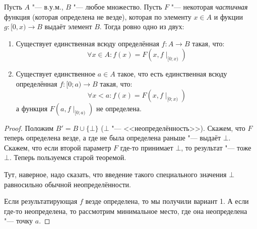 \begin{theorem}
	Пусть $A$ "--- в.у.м., $B$ "--- любое множество.
	Пусть $F$ "--- некоторая \textit{частичная} функция (которая определена не везде),
	которая по элементу $x \in A$ и фукции $g \colon [0, x) \to B$ выдаёт элемент $B$.
	Тогда ровно одно из двух:
	\begin{enumerate}
		\item
			Существует единственная всюду определённая $f \colon A \to B$ такая, что:
			\[ \forall x \in A \colon f(x) = F(x, f\mid_{[0; x)}) \]
		\item
			Существует единственное $a \in A$ такое, что есть единственная всюду определённая $f \colon [0; a) \to B$ такая, что:
			\[ \forall x < a \colon f(x) = F(x, f\mid_{[0; x)}) \]
			а функция $F(a, f\mid_{[0; a)})$ не определена.
	\end{enumerate}
\end{theorem}
\begin{proof}
	Положим $B' = B \cup \{ \bot \}$ ($\bot$ "--- <<неопределённость>>).
	Скажем, что $F$ теперь определена везде, а где не была определена раньше "--- выдаёт $\bot$.
	Скажем, что если второй параметр $F$ где-то принимает $\bot$, то результат "--- тоже $\bot$.
	Теперь пользуемся старой теоремой.
	\begin{Rem}
		Тут, наверное, надо сказать, что введение такого специального значения $\bot$
		равносильно обычной неопределённости.
	\end{Rem}

	Если результатирующая $f$ везде определена, то мы получили вариант 1.
	А если где-то неопределена, то рассмотрим минимальное место, где она неопределена "--- точку $a$.
\end{proof}
